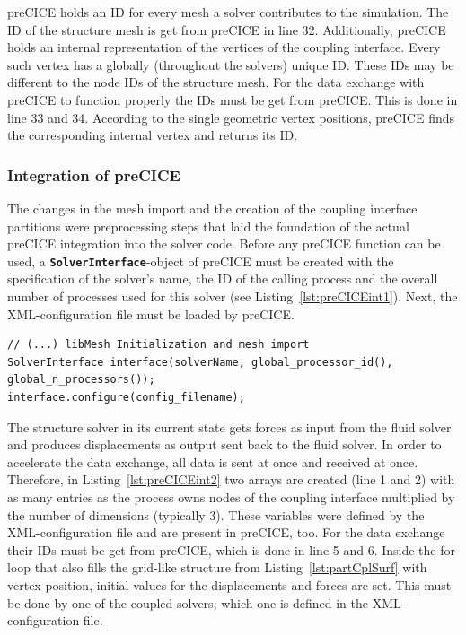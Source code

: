    preCICE holds an ID for every mesh a solver contributes to the simulation. The ID of the structure mesh is get from preCICE in line 32. Additionally, preCICE holds an internal representation of the vertices of the coupling interface. Every such vertex has a globally (throughout the solvers) unique ID. These IDs may be different to the node IDs of the structure mesh. For the data exchange with preCICE to function properly the IDs must be get from preCICE. This is done in line 33 and 34. According to the single geometric vertex positions, preCICE finds the corresponding internal vertex and returns its ID.

  \subsubsection{Integration of preCICE}\label{sec:Coupl-Impl-Integration}
   The changes in the mesh import and the creation of the coupling interface partitions were preprocessing steps that laid the foundation of the actual preCICE integration into the solver code. Before any preCICE function can be used, a \texttt{\textbf{SolverInterface}}-object of preCICE must be created with the specification of the solver's name, the ID of the calling process and the overall number of processes used for this solver (see Listing~\ref{lst:preCICEint1}). Next, the XML-configuration file must be loaded by preCICE.
\begin{lstlisting}[caption=preCICE Integration Part 1,label=lst:preCICEint1,keepspaces=true]
// (...) libMesh Initialization and mesh import
SolverInterface interface(solverName, global_processor_id(), global_n_processors());
interface.configure(config_filename);
\end{lstlisting}
   The structure solver in its current state gets forces as input from the fluid solver and produces displacements as output sent back to the fluid solver. In order to accelerate the data exchange, all data is sent at once and received at once. Therefore, in Listing~\ref{lst:preCICEint2} two arrays are created (line 1 and 2) with as many entries as the process owns nodes of the coupling interface multiplied by the number of dimensions (typically 3). These variables were defined by the XML-configuration file and are present in preCICE, too. For the data exchange their IDs must be get from preCICE, which is done in line 5 and 6. Inside the for-loop that also fills the grid-like structure from Listing~\ref{lst:partCplSurf} with vertex position, initial values for the displacements and forces are set. This must be done by one of the coupled solvers; which one is defined in the XML-configuration file.

